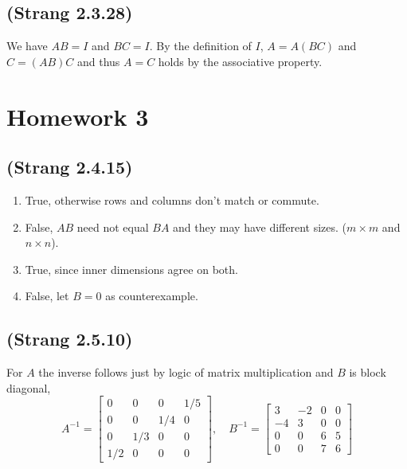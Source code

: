 \documentclass[10pt]{article}
\begin{document}
\subsection{(Strang 2.3.28)}
We have $AB = I$ and $BC = I$. By the definition of $I$, $A = A(BC)$ and $C = (AB)C$ and thus $A = C$ holds by the associative property.

\section{Homework 3}
\subsection{(Strang 2.4.15)}
\begin{enumerate}
\item True, otherwise rows and columns don't match or commute.
\item False, $AB$ need not equal $BA$ and they may have different sizes. ($m\times m$ and $n\times n$).
\item True, since inner dimensions agree on both.
\item False, let $B=0$ as counterexample.
\end{enumerate}

\subsection{(Strang 2.5.10)}
For $A$ the inverse follows just by logic of matrix multiplication and $B$ is block diagonal,
\[A^{-1} = \begin{bmatrix}0& 0& 0& 1/5\\0& 0& 1/4& 0\\0& 1/3& 0& 0\\1/2& 0&0 &0\end{bmatrix},\quad B^{-1} = \begin{bmatrix}3& -2& 0& 0\\-4& 3&0&0\\0&0&6&5\\0&0&7&6\end{bmatrix}\]
\end{document}
